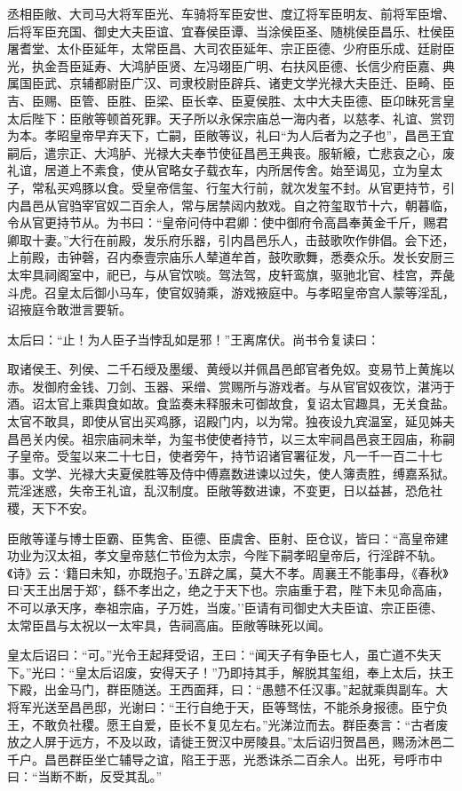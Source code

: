 \documentclass[]{article}
\begin{document}
丞相臣敞、大司马大将军臣光、车骑将军臣安世、度辽将军臣明友、前将军臣增、后将军臣充国、御史大夫臣谊、宜春侯臣谭、当涂侯臣圣、随桃侯臣昌乐、杜侯臣屠耆堂、太仆臣延年，太常臣昌、大司农臣延年、宗正臣德、少府臣乐成、廷尉臣光，执金吾臣延寿、大鸿胪臣贤、左冯翊臣广明、右扶风臣德、长信少府臣嘉、典属国臣武、京辅都尉臣广汉、司隶校尉臣辟兵、诸吏文学光禄大夫臣迁、臣畸、臣吉、臣赐、臣管、臣胜、臣梁、臣长幸、臣夏侯胜、太中大夫臣德、臣卬昧死言皇太后陛下：臣敞等顿首死罪。天子所以永保宗庙总一海内者，以慈孝、礼谊、赏罚为本。孝昭皇帝早弃天下，亡嗣，臣敞等议，礼曰``为人后者为之子也''，昌邑王宜嗣后，遣宗正、大鸿胪、光禄大夫奉节使征昌邑王典丧。服斩縗，亡悲哀之心，废礼谊，居道上不素食，使从官略女子载衣车，内所居传舍。始至谒见，立为皇太子，常私买鸡豚以食。受皇帝信玺、行玺大行前，就次发玺不封。从官更持节，引内昌邑从官驺宰官奴二百余人，常与居禁闼内敖戏。自之符玺取节十六，朝暮临，令从官更持节从。为书曰：``皇帝问侍中君卿：使中御府令高昌奉黄金千斤，赐君卿取十妻。''大行在前殿，发乐府乐器，引内昌邑乐人，击鼓歌吹作俳倡。会下还，上前殿，击钟磬，召内泰壹宗庙乐人辇道牟首，鼓吹歌舞，悉奏众乐。发长安厨三太牢具祠阁室中，祀已，与从官饮啖。驾法驾，皮轩鸾旗，驱驰北官、桂宫，弄彘斗虎。召皇太后御小马车，使官奴骑乘，游戏掖庭中。与孝昭皇帝宫人蒙等淫乱，诏掖庭令敢泄言要斩。

太后曰：``止！为人臣子当悖乱如是邪！''王离席伏。尚书令复读曰：

取诸侯王、列侯、二千石绶及墨缓、黄绶以并佩昌邑郎官者免奴。变易节上黄旄以赤。发御府金钱、刀剑、玉器、采缯、赏赐所与游戏者。与从官官奴夜饮，湛沔于酒。诏太官上乘舆食如故。食监奏未释服未可御故食，复诏太官趣具，无关食盐。太官不敢具，即使从官出买鸡豚，诏殿门内，以为常。独夜设九宾温室，延见姊夫昌邑关内侯。祖宗庙祠未举，为玺书使使者持节，以三太牢祠昌邑哀王园庙，称嗣子皇帝。受玺以来二十七日，使者旁午，持节诏诸官署征发，凡一千一百二十七事。文学、光禄大夫夏侯胜等及侍中傅嘉数进谏以过失，使人簿责胜，缚嘉系狱。荒淫迷惑，失帝王礼谊，乱汉制度。臣敞等数进谏，不变更，日以益甚，恐危社稷，天下不安。

臣敞等谨与博士臣霸、臣隽舍、臣德、臣虞舍、臣射、臣仓议，皆曰：``高皇帝建功业为汉太祖，孝文皇帝慈仁节俭为太宗，今陛下嗣孝昭皇帝后，行淫辟不轨。《诗》云：`籍曰未知，亦既抱子。'五辟之属，莫大不孝。周襄王不能事母，《春秋》曰`天王出居于郑'，繇不孝出之，绝之于天下也。宗庙重于君，陛下未见命高庙，不可以承天序，奉祖宗庙，子万姓，当废。''臣请有司御史大夫臣谊、宗正臣德、太常臣昌与太祝以一太牢具，告祠高庙。臣敞等昧死以闻。

皇太后诏曰：``可。''光令王起拜受诏，王曰：``闻天子有争臣七人，虽亡道不失天下。''光曰：``皇太后诏废，安得天子！''乃即持其手，解脱其玺组，奉上太后，扶王下殿，出金马门，群臣随送。王西面拜，曰：``愚戆不任汉事。''起就乘舆副车。大将军光送至昌邑邸，光谢曰：``王行自绝于天，臣等驽怯，不能杀身报德。臣宁负王，不敢负社稷。愿王自爱，臣长不复见左右。''光涕泣而去。群臣奏言：``古者废放之人屏于远方，不及以政，请徙王贺汉中房陵县。''太后诏归贺昌邑，赐汤沐邑二千户。昌邑群臣坐亡辅导之谊，陷王于恶，光悉诛杀二百余人。出死，号呼市中曰：``当断不断，反受其乱。''
\end{document}
